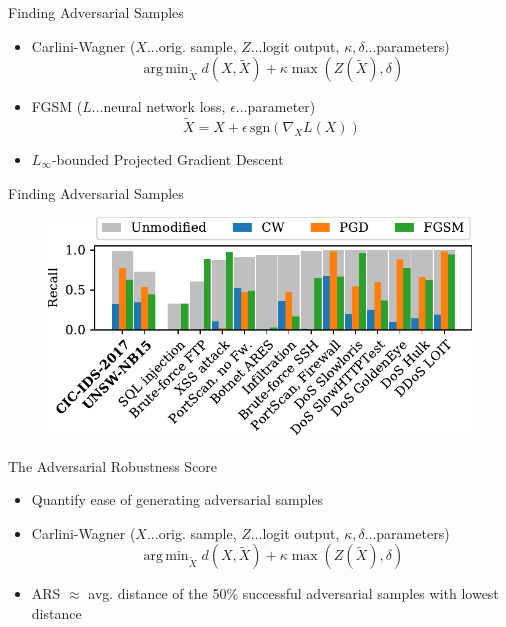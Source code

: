 \documentclass{beamer}
\DeclareMathOperator*{\argmin}{arg\,min}
\begin{document}
\begin{frame}{Finding Adversarial Samples}
\begin{itemize}
\item Carlini-Wagner {\footnotesize ($X$...orig. sample, $Z$...logit output, $\kappa,\delta$...parameters) \hspace*{-1cm} }
\begin{equation*} \label{eq:carliniWagner}
\argmin_{\tilde X}d(X,\tilde X) + \kappa  \max(Z(\tilde X), \delta)
\end{equation*}
\item FGSM {\footnotesize ($L$...neural network loss, $\epsilon$...parameter) }
\begin{equation*}
\tilde X = X + \epsilon \, \text{sgn}( \nabla_X L(X))
\end{equation*}
\item $L_\infty$-bounded Projected Gradient Descent


\end{itemize}
\end{frame}

\begin{frame}{Finding Adversarial Samples}
\begin{figure}[h]
\includegraphics[width=\columnwidth]{../plots/adv_comparison/adv_comparison_17.pdf}
\end{figure}
\end{frame}

\begin{frame}{The Adversarial Robustness Score}
\begin{itemize}
\item Quantify ease of generating adversarial samples
\item Carlini-Wagner {\footnotesize ($X$...orig. sample, $Z$...logit output, $\kappa,\delta$...parameters) \hspace*{-1cm} }
\begin{equation*} \label{eq:carliniWagner}
\argmin_{\tilde X} d(X,\tilde X) + \kappa  \max(Z(\tilde X), \delta)
\end{equation*}
\item ARS $\approx$ avg. distance of the 50\% successful adversarial samples with lowest distance
\end{itemize}
\end{frame}
\end{document}

